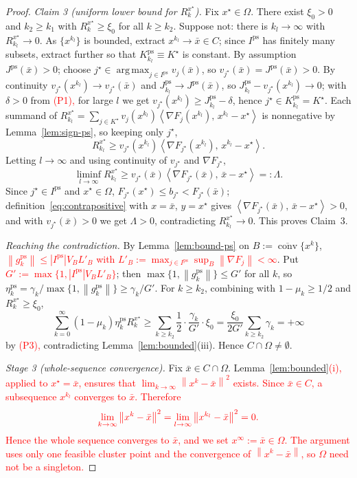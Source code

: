 \documentclass[]{interact}
\theoremstyle{plain}
\theoremstyle{definition}
\theoremstyle{remark}
\newcommand{\norm}[1]{\left\lVert #1 \right\rVert}
\newcommand{\abs}[1]{\left\lvert #1 \right\rvert}
\newcommand{\inner}[2]{\left\langle #1,\, #2 \right\rangle}
\DeclareMathOperator*{\argmax}{arg\,max}
\DeclareMathOperator{\conv}{conv}
\newcommand{\ps}{\mathrm{ps}}
\begin{document}
\begin{proof}
\smallskip
\emph{Claim 3 (uniform lower bound for $R^{x^\star}_k$).} Fix $x^\star\in\Omega$. There exist $\xi_0>0$ and $k_2\ge k_1$ with $R^{x^\star}_k\ge\xi_0$ for all $k\ge k_2$. Suppose not: there is $k_l\to\infty$ with $R^{x^\star}_{k_l}\to0$. As $\{x^{k_l}\}$ is bounded, extract $x^{k_l}\to\bar x\in C$; since $I^{\ps}$ has finitely many subsets, extract further so that $K^{\ps}_{k_l}\equiv K^\star$ is constant. By assumption $J^{\ps}(\bar x)>0$; choose $j^\star\in\argmax_{j\in I^{\ps}}v_j(\bar x)$, so $v_{j^\star}(\bar x)=J^{\ps}(\bar x)>0$. By continuity $v_{j^\star}(x^{k_l})\to v_{j^\star}(\bar x)$ and $J^{\ps}_{k_l}\to J^{\ps}(\bar x)$, so $J^{\ps}_{k_l}-v_{j^\star}(x^{k_l})\to0$; with $\delta>0$ from \leavevmode\textcolor{red}{(P1),} for large $l$ we get $v_{j^\star}(x^{k_l})\ge J^{\ps}_{k_l}-\delta$, hence $j^\star\in K^{\ps}_{k_l}=K^\star$. Each summand of $R^{x^\star}_{k_l}=\sum_{j\in K^\star}v_j(x^{k_l})\inner{\nabla F_j(x^{k_l})}{x^{k_l}-x^\star}$ is nonnegative by Lemma~\ref{lem:sign-ps}, so keeping only $j^\star$,
\[
R^{x^\star}_{k_l}\ge v_{j^\star}(x^{k_l})\inner{\nabla F_{j^\star}(x^{k_l})}{x^{k_l}-x^\star}.
\]
Letting $l\to\infty$ and using continuity of $v_{j^\star}$ and $\nabla F_{j^\star}$,
\[
\liminf_{l\to\infty}R^{x^\star}_{k_l}\ge v_{j^\star}(\bar x)\inner{\nabla F_{j^\star}(\bar x)}{\bar x-x^\star}=:\Lambda .
\]
Since $j^\star\in I^{\ps}$ and $x^\star\in\Omega$, $F_{j^\star}(x^\star)\le b_{j^\star}<F_{j^\star}(\bar x)$; definition~\eqref{eq:contrapositive} with $x=\bar x$, $y=x^\star$ gives $\inner{\nabla F_{j^\star}(\bar x)}{\bar x-x^\star}>0$, and with $v_{j^\star}(\bar x)>0$ we get $\Lambda>0$, contradicting $R^{x^\star}_{k_l}\to0$. This proves Claim~3.

\smallskip
\emph{Reaching the contradiction.} By Lemma~\ref{lem:bound-ps} on $B:=\overline{\conv}\{x^k\}$, \leavevmode\textcolor{red}{$\norm{g^{\ps}_k}\le\abs{I^{\ps}}V_B L'_B$ with $L'_B:=\max_{j\in I^{\ps}}\sup_B\norm{\nabla F_j}<\infty$}. Put \leavevmode\textcolor{red}{$G':=\max\{1,\abs{I^{\ps}}V_B L'_B\}$}; then $\max\{1,\norm{g^{\ps}_k}\}\le G'$ for all $k$, so $\eta^{\ps}_k=\gamma_k/\max\{1,\norm{g^{\ps}_k}\}\ge\gamma_k/G'$. For $k\ge k_2$, combining with $1-\mu_k\ge1/2$ and $R^{x^\star}_k\ge\xi_0$,
\[
\sum_{k=0}^\infty(1-\mu_k)\eta^{\ps}_k R^{x^\star}_k\ge\sum_{k\ge k_2}\frac12\cdot\frac{\gamma_k}{G'}\cdot\xi_0=\frac{\xi_0}{2G'}\sum_{k\ge k_2}\gamma_k=+\infty
\]
by \leavevmode\textcolor{red}{(P3),} contradicting Lemma~\ref{lem:bounded}(iii). Hence $C\cap\Omega\ne\emptyset$.

\emph{Stage 3 (whole-sequence convergence).} Fix $\bar x\in C\cap\Omega$. Lemma~\leavevmode\textcolor{red}{\ref{lem:bounded}(i), applied to $x^\star=\bar x$, ensures that $\lim_{k\to\infty}\norm{x^k-\bar x}^2$ exists. Since $\bar x\in C$, a subsequence $x^{k_l}$ converges to $\bar x$. Therefore}
\[\textcolor{red}{
\lim_{k\to\infty}\norm{x^k-\bar x}^2
=\lim_{l\to\infty}\norm{x^{k_l}-\bar x}^2=0.
}\]
\leavevmode\textcolor{red}{Hence the whole sequence converges to $\bar x$, and we set $x^\infty:=\bar x\in\Omega$. The argument uses only one feasible cluster point and the convergence of $\norm{x^k-\bar x}$, so $\Omega$ need not be a singleton.}
\end{proof}
\end{document}
